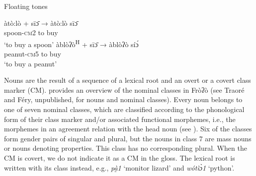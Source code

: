 \documentclass[output=paper]{langscibook}
\begin{document}
\begin{exe}
 \ex Floating tones \label{ex:traore:floating_tones:2}
\begin{xlist}
 \ex   \gll àtò:lò            +    sīɔ̄                  →          àtò:lò sīɔ̄  \label{ex:traore:floating_tones:2a}\\
          spoon-\textsc{cm}2    {}       {to buy}   {}            {}\\
        \trans `to buy a spoon’
 \ex  \gll àblòʔò\textsuperscript{H}      +    sīɔ̄                  →          àblòʔò síɔ́ \label{ex:traore:floating_tones:2b}\\
      peanut-\textsc{cm}5           {}    {to buy}          {}          {}\\
      \trans ‘to buy a peanut’
\end{xlist}
\end{exe}
 

 Nouns are the result of a sequence of a lexical root and an overt or a covert class marker (CM).  provides an overview of the nominal classes in Fròʔò (see Traoré and Féry, unpublished, for nouns and nominal classes). Every noun belongs to one of seven nominal classes, which are classified according to the phonological form of their class marker and/or associated functional morphemes, i.e., the morphemes in an agreement relation with the head noun (see \citealt{Corbett1991}). Six of the classes form gender pairs of singular and plural, but the nouns in class 7 are mass nouns or nouns denoting properties. This class has no corresponding plural. When the CM is covert, we do not indicate it as a CM in the gloss. The lexical root is written with its class instead, e.g., \textit{pà̰1} ‘monitor lizard’ and \textit{wótìɔ̀1} ‘python’.
\end{document}
